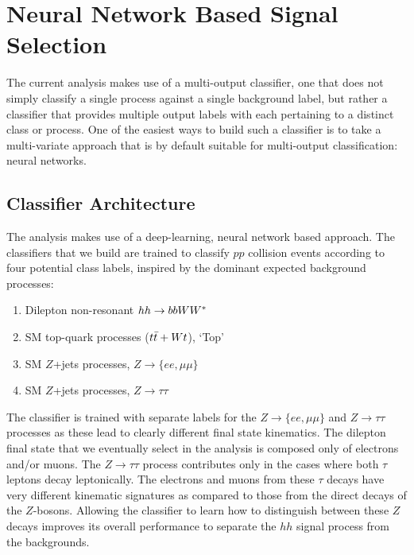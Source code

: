 \section{Neural Network Based Signal Selection}
\label{sec:hh_strategy}

%
%


The current analysis makes use of a multi-output classifier, one that does not simply classify
a single process against a single background label, but rather a classifier that provides multiple
output labels with each pertaining to a distinct class or process.
One of the easiest ways to build such a classifier is to take a multi-variate approach that
is by default suitable for multi-output classification: neural networks.

\subsection{Classifier Architecture}
\label{sec:nn_arch}

The analysis makes use of a deep-learning, neural network based approach.
The classifiers that we build are trained to classify $pp$ collision events according to
four potential class labels, inspired by the dominant expected background processes:
\begin{enumerate}
    \item Dilepton non-resonant $hh \rightarrow bbWW^*$
    \item SM top-quark processes ($t\bar{t} + Wt$), `Top'
    \item SM $Z$+jets processes, $Z \rightarrow \{ee,\mu\mu\}$
    \item SM $Z$+jets processes, $Z \rightarrow \tau\tau$
\end{enumerate}
The classifier is trained with separate labels for the $Z \rightarrow \{ee,\mu\mu\}$ and
$Z \rightarrow \tau\tau$ processes as these lead to clearly different final state kinematics.
The dilepton final state that we eventually select in the analysis is composed only of electrons and/or muons.
The $Z \rightarrow \tau\tau$ process contributes only in the cases where both $\tau$ leptons decay
leptonically.
The electrons and muons from these $\tau$ decays have very different kinematic signatures as compared
to those from the direct decays of the $Z$-bosons.
Allowing the classifier to learn how to distinguish between these $Z$ decays improves its overall performance
to separate the $hh$ signal process from the backgrounds.

